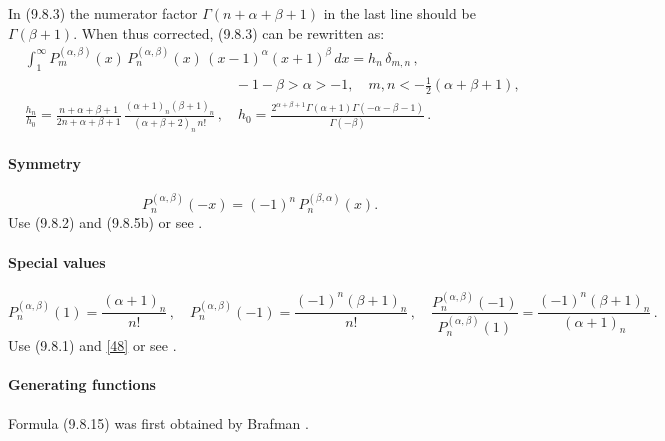 \documentclass[twoside,11pt]{article}
\newcommand\al\alpha
\newcommand\be\beta
\newcommand\de\delta
\newcommand\Ga{\Gamma}
\newcommand\thalf{\tfrac12}
\newcommand\iy\infty
\begin{document}
In (9.8.3) the numerator factor $\Ga(n+\al+\be+1)$ in the last line should be
$\Ga(\be+1)$. When thus corrected, (9.8.3) can be rewritten as:
\begin{equation}
\begin{split}
&\int_1^\iy P_m^{(\al,\be)}(x)\,P_n^{(\al,\be)}(x)\,(x-1)^\al (x+1)^\be\,dx=h_n\,\de_{m,n}\,,\\
&\qquad\qquad\qquad\qquad\qquad\qquad\qquad\quad-1-\be>\al>-1,\quad m,n<-\thalf(\al+\be+1),\\
&\frac{h_n}{h_0}=
\frac{n+\al+\be+1}{2n+\al+\be+1}\,
\frac{(\al+1)_n(\be+1)_n}{(\al+\be+2)_n\,n!}\,,\quad
h_0=\frac{2^{\al+\be+1}\Ga(\al+1)\Ga(-\al-\be-1)}{\Ga(-\be)}\,.
\end{split}
\label{122}
\end{equation}

%
\paragraph{Symmetry}
\begin{equation}
P_n^{(\al,\be)}(-x)=(-1)^n\,P_n^{(\be,\al)}(x).
\label{48}
\end{equation}
Use (9.8.2) and (9.8.5b) or see .
%
\paragraph{Special values}
\begin{equation}
P_n^{(\al,\be)}(1)=\frac{(\al+1)_n}{n!}\,,\quad
P_n^{(\al,\be)}(-1)=\frac{(-1)^n(\be+1)_n}{n!}\,,\quad
\frac{P_n^{(\al,\be)}(-1)}{P_n^{(\al,\be)}(1)}=\frac{(-1)^n(\be+1)_n}{(\al+1)_n}\,.
\label{50}
\end{equation}
Use (9.8.1) and \eqref{48} or see .
%
\paragraph{Generating functions}
Formula (9.8.15) was first obtained by Brafman .
%
\end{document}
